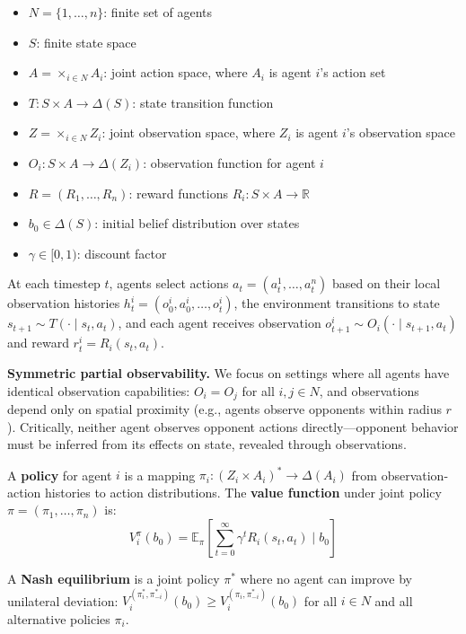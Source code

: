 \documentclass{article}
\begin{document}
\begin{itemize}
    \item $N = \{1, \ldots, n\}$: finite set of agents
    \item $S$: finite state space
    \item $A = \times_{i \in N} A_i$: joint action space, where $A_i$ is agent $i$'s action set
    \item $T: S \times A \to \Delta(S)$: state transition function
    \item $Z = \times_{i \in N} Z_i$: joint observation space, where $Z_i$ is agent $i$'s observation space
    \item $O_i: S \times A \to \Delta(Z_i)$: observation function for agent $i$
    \item $R = (R_1, \ldots, R_n)$: reward functions $R_i: S \times A \to \mathbb{R}$
    \item $b_0 \in \Delta(S)$: initial belief distribution over states
    \item $\gamma \in [0,1)$: discount factor
\end{itemize}

At each timestep $t$, agents select actions $a_t = (a_t^1, \ldots, a_t^n)$ based on their local observation histories $h_t^i = (o_0^i, a_0^i, \ldots, o_t^i)$, the environment transitions to state $s_{t+1} \sim T(\cdot \mid s_t, a_t)$, and each agent receives observation $o_{t+1}^i \sim O_i(\cdot \mid s_{t+1}, a_t)$ and reward $r_t^i = R_i(s_t, a_t)$.

\textbf{Symmetric partial observability.} We focus on settings where all agents have identical observation capabilities: $O_i = O_j$ for all $i,j \in N$, and observations depend only on spatial proximity (e.g., agents observe opponents within radius $r$). Critically, neither agent observes opponent actions directly---opponent behavior must be inferred from its effects on state, revealed through observations.

A \textbf{policy} for agent $i$ is a mapping $\pi_i: (Z_i \times A_i)^* \to \Delta(A_i)$ from observation-action histories to action distributions. The \textbf{value function} under joint policy $\pi = (\pi_1, \ldots, \pi_n)$ is:
\begin{equation}
V_i^\pi(b_0) = \mathbb{E}_\pi \left[ \sum_{t=0}^\infty \gamma^t R_i(s_t, a_t) \mid b_0 \right]
\end{equation}

A \textbf{Nash equilibrium} is a joint policy $\pi^*$ where no agent can improve by unilateral deviation: $V_i^{(\pi_i^*, \pi_{-i}^*)}(b_0) \geq V_i^{(\pi_i, \pi_{-i}^*)}(b_0)$ for all $i \in N$ and all alternative policies $\pi_i$.
\end{document}
